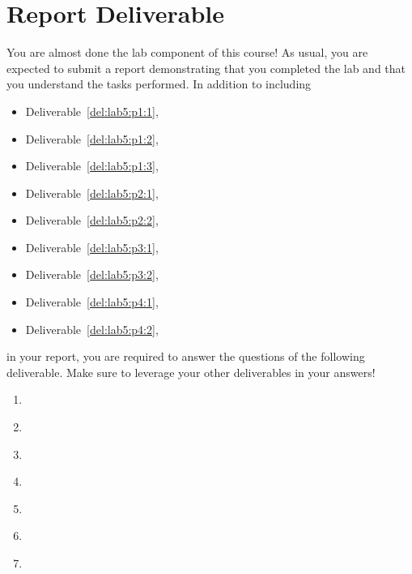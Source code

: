 \section{Report Deliverable}\label{Lab:5:Report}
You are almost done the lab component of this course!
As usual, you are expected to submit a report demonstrating that you completed the lab and that you understand the tasks performed.
In addition to including
\begin{itemize}
  \item{Deliverable~\ref{del:lab5:p1:1},}
  \item{Deliverable~\ref{del:lab5:p1:2},}
  \item{Deliverable~\ref{del:lab5:p1:3},}
  \item{Deliverable~\ref{del:lab5:p2:1},}
  \item{Deliverable~\ref{del:lab5:p2:2},}
  \item{Deliverable~\ref{del:lab5:p3:1},}
  \item{Deliverable~\ref{del:lab5:p3:2},}
  \item{Deliverable~\ref{del:lab5:p4:1},}
  \item{Deliverable~\ref{del:lab5:p4:2},}
\end{itemize}
in your report, you are required to answer the questions of the following deliverable.
Make sure to leverage your other deliverables in your answers!
\begin{deliverable}[label={lab5:report}]
  \begin{enumerate}[label={(\arabic*)}]
    \item{%
      \label{lab5:report:q1}
    }
    \item{%
      \label{lab5:report:q2}
    }
    \item{%
      \label{lab5:report:q3}
    }
    \item{%
      \label{lab5:report:q4}
    }
    \item{%
      \label{lab5:report:q5}
    }
    \item{%
      \label{lab5:report:q6}
    }
    \item{%
      \label{lab5:report:q7}
    }
  \end{enumerate}
\end{deliverable}

